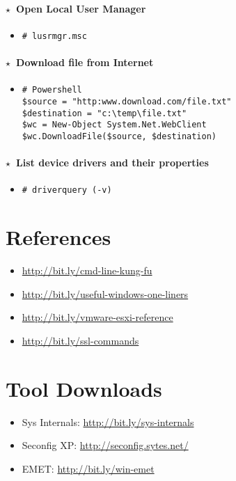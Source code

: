 \documentclass[10pt,landscape]{article}
\newcommand{\os}[1]{\texttt{\footnotesize{#1}}}
\newcommand{\windows}{\os{W}}
\newenvironment{action}[1]
  {\paragraph{$\star$~#1}\begin{itemize}[leftmargin=1cm]}
  {\end{itemize}}
\newcommand{\cmd}[2]{\item[#1] {\small\tt\# #2}}
\begin{document}
\begin{multicols*}{3}
\begin{action}{Open Local User Manager}
\cmd{\windows}{lusrmgr.msc}
\end{action}

\begin{action}{Download file from Internet}
\cmd{\windows}{
Powershell \\
\$source = "http:www.download.com/file.txt" \\
\$destination = "c:\textbackslash temp\textbackslash file.txt" \\
\$wc = New-Object System.Net.WebClient \\
\$wc.DownloadFile(\$source, \$destination)}
\end{action}

\begin{action}{List device drivers and their properties}
\cmd{\windows}{driverquery (-v)}
\end{action}

\section*{References}

\begin{itemize}
\small
\item \url{http://bit.ly/cmd-line-kung-fu}
\item \url{http://bit.ly/useful-windows-one-liners}
\item \url{http://bit.ly/vmware-esxi-reference}
\item \url{http://bit.ly/ssl-commands}
\end{itemize}

\section*{Tool Downloads}

\begin{itemize}
\small
\item Sys Internals: \url{http://bit.ly/sys-internals}
\item Seconfig XP: \url{http://seconfig.sytes.net/}
\item EMET: \url{http://bit.ly/win-emet}
\end{itemize}
\end{multicols*}
\end{document}
